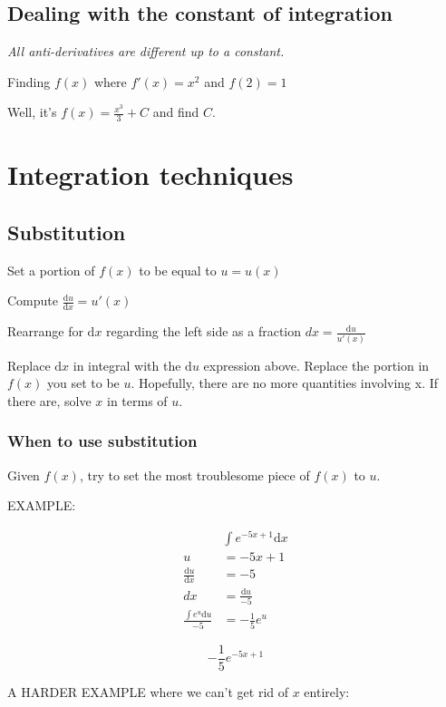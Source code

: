 \documentclass[12pt]{article}
\theoremstyle{plain}
\theoremstyle{remark}
\theoremstyle{definition}
\begin{document}
\subsection{Dealing with the constant of
integration}

\emph{All anti-derivatives are different up to a constant.}

Finding \(f(x)\) where \(f'(x) = x^{2}\) and \(f(2) = 1\)

Well, it's \(f(x) = \frac{x^{3}}{3} + C\) and find \(C\).


\section{Integration techniques}


\subsection{Substitution}

Set a portion of \(f(x)\) to be equal to \(u = u(x)\)

Compute \(\frac{\text{d}u}{\text{d}x} = u'(x)\)

Rearrange for \(\text{d}x\) regarding the left side as a fraction
\(dx = \frac{\text{d}u}{u'(x)}\)

Replace \(\text{d}x\) in integral with the \(\text{d}u\) expression
above. Replace the portion in \(f(x)\) you set to be \(u\). Hopefully,
there are no more quantities involving x. If there are, solve \(x\) in
terms of \(u\).


\subsubsection{When to use
substitution}

Given \(f(x)\), try to set the most troublesome piece of \(f(x)\) to
\(u\).

EXAMPLE:

\begin{align*}
&\int e^{- 5x + 1}\text{d}x \\
u &= - 5x + 1 \\
\frac{\text{d}u}{\text{d}x} &= - 5 \\
dx &= \frac{\text{d}u}{- 5} \\
\frac{\int e^{u}\text{d}u}{- 5} &= - \frac{1}{5}e^{u}
\end{align*}


\[- \frac{1}{5}e^{- 5x + 1}\]

A HARDER EXAMPLE where we can't get rid of \(x\) entirely:
\end{document}
